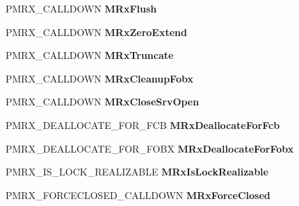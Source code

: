 \begin{DoxyCompactItemize}
P\+M\+R\+X\+\_\+\+C\+A\+L\+L\+D\+O\+WN {\bfseries M\+Rx\+Flush}
\item 
\mbox{\label{struct___m_i_n_i_r_d_r___d_i_s_p_a_t_c_h_a9693b3124603e007fcb9cb90bce11efe}} 
P\+M\+R\+X\+\_\+\+C\+A\+L\+L\+D\+O\+WN {\bfseries M\+Rx\+Zero\+Extend}
\item 
\mbox{\label{struct___m_i_n_i_r_d_r___d_i_s_p_a_t_c_h_af79503b3920ebab810ca9dd3ad4c26b5}} 
P\+M\+R\+X\+\_\+\+C\+A\+L\+L\+D\+O\+WN {\bfseries M\+Rx\+Truncate}
\item 
\mbox{\label{struct___m_i_n_i_r_d_r___d_i_s_p_a_t_c_h_a34b190b961a98cdcf37b627a80fd14f7}} 
P\+M\+R\+X\+\_\+\+C\+A\+L\+L\+D\+O\+WN {\bfseries M\+Rx\+Cleanup\+Fobx}
\item 
\mbox{\label{struct___m_i_n_i_r_d_r___d_i_s_p_a_t_c_h_afa1828ea0ba19fa05d77d36601afe4ca}} 
P\+M\+R\+X\+\_\+\+C\+A\+L\+L\+D\+O\+WN {\bfseries M\+Rx\+Close\+Srv\+Open}
\item 
\mbox{\label{struct___m_i_n_i_r_d_r___d_i_s_p_a_t_c_h_ae5f2bc554dce8e4935692985e73d4219}} 
P\+M\+R\+X\+\_\+\+D\+E\+A\+L\+L\+O\+C\+A\+T\+E\+\_\+\+F\+O\+R\+\_\+\+F\+CB {\bfseries M\+Rx\+Deallocate\+For\+Fcb}
\item 
\mbox{\label{struct___m_i_n_i_r_d_r___d_i_s_p_a_t_c_h_a7636bab123c6b1d731031638867fc515}} 
P\+M\+R\+X\+\_\+\+D\+E\+A\+L\+L\+O\+C\+A\+T\+E\+\_\+\+F\+O\+R\+\_\+\+F\+O\+BX {\bfseries M\+Rx\+Deallocate\+For\+Fobx}
\item 
\mbox{\label{struct___m_i_n_i_r_d_r___d_i_s_p_a_t_c_h_a98e1b9f6bea64e74eed6e689d1feed24}} 
P\+M\+R\+X\+\_\+\+I\+S\+\_\+\+L\+O\+C\+K\+\_\+\+R\+E\+A\+L\+I\+Z\+A\+B\+LE {\bfseries M\+Rx\+Is\+Lock\+Realizable}
\item 
\mbox{\label{struct___m_i_n_i_r_d_r___d_i_s_p_a_t_c_h_a846587c8d9b5710db352756a79e8fdef}} 
P\+M\+R\+X\+\_\+\+F\+O\+R\+C\+E\+C\+L\+O\+S\+E\+D\+\_\+\+C\+A\+L\+L\+D\+O\+WN {\bfseries M\+Rx\+Force\+Closed}

\end{DoxyCompactItemize}
